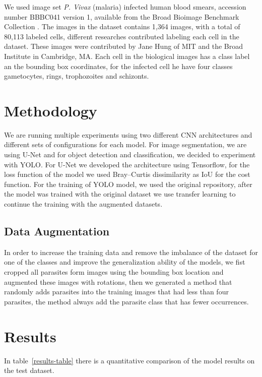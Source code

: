 \documentclass{article} %
\begin{document}
We used image set \textit{P. Vivax} (malaria) infected human blood smears, accession number BBBC041 version 1, available from the Broad Bioimage Benchmark Collection \citep{Ljosa2012}.
The images in the dataset contains 1,364 images, with a total of 80,113 labeled cells, different researches contributed labeling each cell in the dataset. These images were contributed by Jane Hung of MIT and the Broad Institute in Cambridge, MA. Each cell in the biological images has a class label an the bounding box coordinates, for the infected cell he have four classes gametocytes, rings, trophozoites and schizonts.


\section{Methodology}
\label{gen_inst}
We are running multiple experiments using two different CNN architectures and different sets of configurations for each model. For image segmentation, we are using U-Net \citep{10.1007/978-3-319-24574-4_28} and for object detection and classification, we decided to experiment with YOLO\citep{yolo}. 
For U-Net we developed the architecture using Tensorflow, for the loss function of the model we used Bray–Curtis dissimilarity as IoU for the cost function.  For the training of YOLO model, we used the original repository, after the model was trained with the original dataset we use transfer learning to continue the training with the augmented datasets.


\subsection{Data Augmentation}
In order to increase the training data and remove the imbalance of the dataset for one of the classes and improve the generalization ability of the models, we fist cropped all parasites form images using the bounding box location and augmented these images with rotations, then we generated a method that randomly adds parasites into the training images that had less than four parasites, the method always add the parasite class that has fewer occurrences.


\section{Results}
\label{headings}
In table~\ref{results-table} there is a quantitative comparison of the model results on the test dataset.
\end{document}
